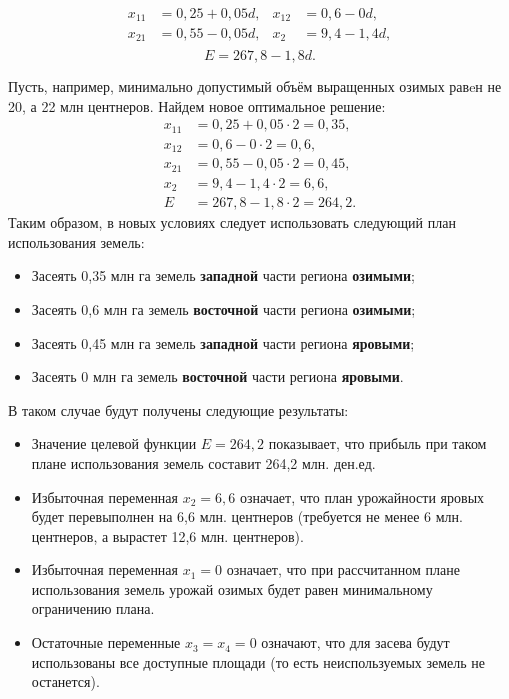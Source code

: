 \begin{equation}
  \label{eq:Analisys_2m}
  \begin{aligned}
    x_{11} &= 0{,}25 + 0{,}05d, &
    x_{12} &= 0{,}6 - 0d, \\
    x_{21} &= 0{,}55 - 0{,}05d, &
    x_{2} &= 9{,}4 - 1{,}4d, \\
  \end{aligned}
\end{equation}
\begin{equation}
  E = 267{,}8 - 1{,}8d.
\end{equation}

Пусть, например, минимально допустимый объём выращенных озимых равeн не 20, а 22 млн центнеров.
Найдем новое оптимальное решение: 
\begin{equation}
    \begin{aligned}
      x_{11} &= 0{,}25 + 0{,}05 \cdot 2 = 0{,}35, \\
      x_{12} &= 0{,}6 - 0 \cdot 2 = 0{,}6, \\
      x_{21} &= 0{,}55 - 0{,}05 \cdot 2 = 0{,}45, \\
      x_{2} &= 9{,}4 - 1{,}4 \cdot 2 = 6{,}6, \\
      E &= 267{,}8 - 1{,}8 \cdot 2 = 264{,}2.
    \end{aligned}
\end{equation}
Таким образом, в новых условиях следует использовать следующий план использования земель:
\begin{itemize}
\item Засеять 0{,}35 млн га земель \textbf{западной} части региона \textbf{озимыми};
\item Засеять 0{,}6 млн га земель \textbf{восточной} части региона \textbf{озимыми};
\item Засеять 0{,}45 млн га земель \textbf{западной} части региона \textbf{яровыми};
\item Засеять 0 млн га земель \textbf{восточной} части региона \textbf{яровыми}.
\end{itemize}

В таком случае будут получены следующие результаты:
\begin{itemize}

\item Значение целевой функции $ E = 264{,}2 $ показывает, что прибыль при таком
  плане использования земель составит 264{,}2 млн. ден.ед.

\item Избыточная переменная $ x_{2} = 6{,}6 $ означает, что план урожайности яровых 
  будет перевыполнен на 6{,}6 млн. центнеров (требуется не менее 6 млн. центнеров, а
  вырастет 12{,}6 млн. центнеров).

\item Избыточная переменная $ x_{1} = 0 $ означает, что при рассчитанном плане использования
  земель урожай озимых будет равен минимальному ограничению плана.

\item Остаточные переменные $ x_{3} = x_{4} = 0 $ означают, что для засева будут
  использованы все доступные площади (то есть неиспользуемых земель не останется).
\end{itemize}

